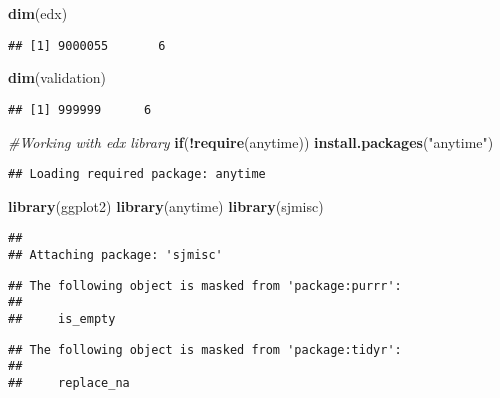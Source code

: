 \documentclass[
]{article}
\newenvironment{Shaded}{\begin{snugshade}}{\end{snugshade}}
\newcommand{\CommentTok}[1]{\textcolor[rgb]{0.56,0.35,0.01}{\textit{#1}}}
\newcommand{\ControlFlowTok}[1]{\textcolor[rgb]{0.13,0.29,0.53}{\textbf{#1}}}
\newcommand{\KeywordTok}[1]{\textcolor[rgb]{0.13,0.29,0.53}{\textbf{#1}}}
\newcommand{\NormalTok}[1]{#1}
\newcommand{\OperatorTok}[1]{\textcolor[rgb]{0.81,0.36,0.00}{\textbf{#1}}}
\newcommand{\StringTok}[1]{\textcolor[rgb]{0.31,0.60,0.02}{#1}}
\begin{document}
\begin{Shaded}
\begin{Highlighting}[]
\KeywordTok{dim}\NormalTok{(edx)}
\end{Highlighting}
\end{Shaded}

\begin{verbatim}
## [1] 9000055       6
\end{verbatim}

\begin{Shaded}
\begin{Highlighting}[]
\KeywordTok{dim}\NormalTok{(validation)}
\end{Highlighting}
\end{Shaded}

\begin{verbatim}
## [1] 999999      6
\end{verbatim}

\begin{Shaded}
\begin{Highlighting}[]
\CommentTok{#Working with edx library}
\ControlFlowTok{if}\NormalTok{(}\OperatorTok{!}\KeywordTok{require}\NormalTok{(anytime)) }\KeywordTok{install.packages}\NormalTok{(}\StringTok{"anytime"}\NormalTok{)}
\end{Highlighting}
\end{Shaded}

\begin{verbatim}
## Loading required package: anytime
\end{verbatim}

\begin{Shaded}
\begin{Highlighting}[]
\KeywordTok{library}\NormalTok{(ggplot2)}
\KeywordTok{library}\NormalTok{(anytime)}
\KeywordTok{library}\NormalTok{(sjmisc)}
\end{Highlighting}
\end{Shaded}

\begin{verbatim}
## 
## Attaching package: 'sjmisc'
\end{verbatim}

\begin{verbatim}
## The following object is masked from 'package:purrr':
## 
##     is_empty
\end{verbatim}

\begin{verbatim}
## The following object is masked from 'package:tidyr':
## 
##     replace_na
\end{verbatim}
\end{document}
